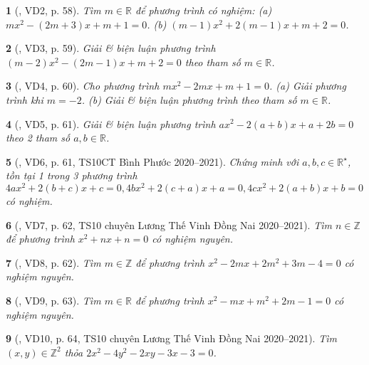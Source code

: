 \documentclass{article}
\newtheorem{baitoan}{}
\begin{document}
\begin{baitoan}[\cite{Thu_Viet_Minh_ptb2}, VD2, p. 58]
	Tìm $m\in\mathbb{R}$ để phương trình có nghiệm: (a) $mx^2 - (2m + 3)x + m + 1 = 0$. (b) $(m - 1)x^2 + 2(m - 1)x + m + 2 = 0$.
\end{baitoan}

\begin{baitoan}[\cite{Thu_Viet_Minh_ptb2}, VD3, p. 59]
	Giải \& biện luận phương trình $(m - 2)x^2 - (2m - 1)x + m + 2 = 0$ theo tham số $m\in\mathbb{R}$.
\end{baitoan}

\begin{baitoan}[\cite{Thu_Viet_Minh_ptb2}, VD4, p. 60]
	Cho phương trình $mx^2 - 2mx + m + 1 = 0$. (a) Giải phương trình khi $m = -2$. (b) Giải \& biện luận phương trình theo tham số $m\in\mathbb{R}$.
\end{baitoan}

\begin{baitoan}[\cite{Thu_Viet_Minh_ptb2}, VD5, p. 61]
	Giải \& biện luận phương trình $ax^2 - 2(a + b)x + a + 2b = 0$ theo 2 tham số $a,b\in\mathbb{R}$.
\end{baitoan}

\begin{baitoan}[\cite{Thu_Viet_Minh_ptb2}, VD6, p. 61, TS10CT Bình Phước 2020--2021]
	Chứng minh với $a,b,c\in\mathbb{R}^\star$, tồn tại 1 trong 3 phương trình $4ax^2 + 2(b + c)x + c = 0,4bx^2 + 2(c + a)x + a = 0,4cx^2 + 2(a + b)x + b = 0$ có nghiệm.
\end{baitoan}

\begin{baitoan}[\cite{Thu_Viet_Minh_ptb2}, VD7, p. 62, TS10 chuyên Lương Thế Vinh Đồng Nai 2020--2021]
	Tìm $n\in\mathbb{Z}$ để phương trình $x^2 + nx + n = 0$ có nghiệm nguyên.
\end{baitoan}

\begin{baitoan}[\cite{Thu_Viet_Minh_ptb2}, VD8, p. 62]
	Tìm $m\in\mathbb{Z}$ để phương trình $x^2 - 2mx + 2m^2 + 3m - 4 = 0$ có nghiệm nguyên.
\end{baitoan}

\begin{baitoan}[\cite{Thu_Viet_Minh_ptb2}, VD9, p. 63]
	Tìm $m\in\mathbb{R}$ để phương trình $x^2 - mx + m^2 + 2m - 1 = 0$ có nghiệm nguyên.
\end{baitoan}

\begin{baitoan}[\cite{Thu_Viet_Minh_ptb2}, VD10, p. 64,  TS10 chuyên Lương Thế Vinh Đồng Nai 2020--2021]
	Tìm $(x,y)\in\mathbb{Z}^2$ thỏa $2x^2 - 4y^2 - 2xy - 3x - 3 = 0$.
\end{baitoan}
\end{document}

